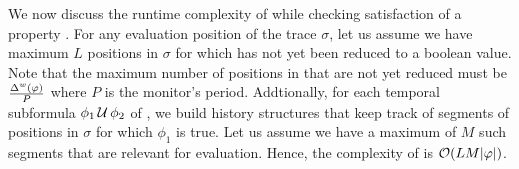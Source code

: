 We now discuss the runtime complexity of \monitor while checking satisfaction of a property \policy.
For any evaluation position of the trace $\sigma$, let us assume we have maximum $L$ positions in $\sigma$ for which \policy has not yet been reduced to a boolean value.
Note that the maximum number of positions in that are not yet reduced must be $\frac{\Delta^w(\varphi)}{P}$ where $P$ is the monitor's period. 
Addtionally, for each temporal subformula $\phi_1\,\mathrm{\cal U}\,\phi_2$ of \policy,
we build history structures that keep track of segments of positions in $\sigma$ for which $\phi_1$ is true. Let us assume we have a maximum of $M$ such segments that are relevant for \policy evaluation.
Hence, the complexity of \monitor is $\mathcal{O}(LM|\varphi|)$.

%
